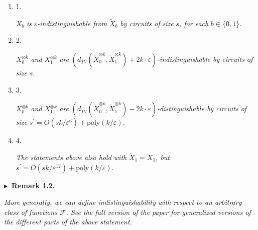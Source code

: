 \documentclass[10pt,a4paper]{article}
\begin{document}
\begin{enumerate}


\item[] 
1. 


$X_{b}$\emph{ is }$\varepsilon$\emph{-indistinguishable from }$\widetilde{X}_{b}$\emph{ by circuits of size }$s$\emph{, for each }$b\in\{0,1\}$\emph{.}\par





\item[] 
2. 


$X_{0}^{\otimes k}$\emph{ and }$X_{1}^{\otimes k}$\emph{ are }$(d_{TV}(\widetilde{X}_{0}^{\otimes k},\widetilde{X}_{1}^{\otimes k})+2k\cdot\varepsilon)$\emph{-indistinguishable by circuits of size }$s$\emph{.}\par





\item[] 
3. 


$X_{0}^{\otimes k}$\emph{ and }$X_{1}^{\otimes k}$\emph{ are }$(d_{TV}(\widetilde{X}_{0}^{\otimes k},\widetilde{X}_{1}^{\otimes k})-2k\cdot\varepsilon)$\emph{-distinguishable by circuits of size }$s^{\prime}=O(sk/\varepsilon^{6})+\text{poly}(k/\varepsilon)$\emph{.}\par





\item[] 
4. 


\emph{The statements above also hold with }$\widetilde{X}_{1}=X_{1}$\emph{, but }$s^{\prime}=O(sk/\varepsilon^{12})+\text{poly}(k/\varepsilon)$\emph{.}\par





\end{enumerate}







\par\medskip\noindent\textbf{
$\blacktriangleright$ Remark 1.2.
}\par



\emph{More generally, we can define indistinguishability with respect to an arbitrary class of functions $\mathcal{F}$. See the full version of the paper for generalized versions of the different parts of the above statement.}\par
\end{document}
